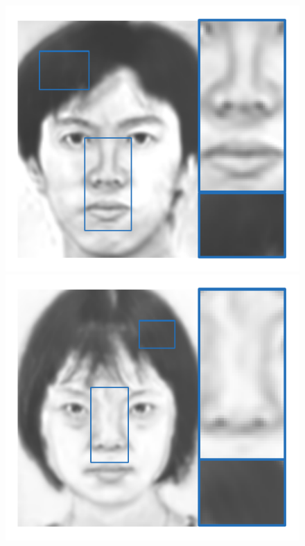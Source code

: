 \documentclass[10pt,twocolumn,letterpaper]{article}
\begin{document}
\begin{figure}[htbp]
\begin{minipage}[t]{0.138\linewidth}
\includegraphics[width=0.99\linewidth]{img/example1_FCNN.pdf}
\includegraphics[width=0.99\linewidth]{img/example2_FCNN.pdf}

\end{minipage}
\end{figure}
\end{document}
